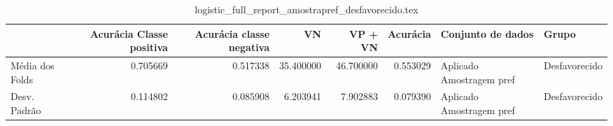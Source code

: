 \begin{table}
\centering
\caption{logistic_full_report_amostrapref_desfavorecido.tex}
\label{logistic_full_report_amostrapref_desfavorecido.tex}
\begin{tabular}{lrrrrrll}
\toprule
{}              &  Acurácia Classe positiva &  Acurácia classe negativa &        VN  &   VP + VN  &  Acurácia &         Conjunto de dados &          Grupo \\
\midrule
Média dos Folds &                  0.705669 &                  0.517338 &  35.400000 &  46.700000 &  0.553029 &  Aplicado Amostragem pref &  Desfavorecido \\
Desv. Padrão    &                  0.114802 &                  0.085908 &   6.203941 &   7.902883 &  0.079390 &  Aplicado Amostragem pref &  Desfavorecido \\
\bottomrule
\end{tabular}
\end{table}
